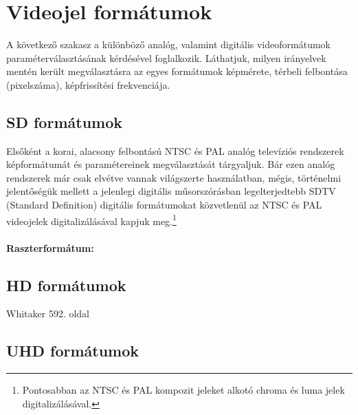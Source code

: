 \section{Videojel formátumok}

A következő szakasz a különböző analóg, valamint digitális videoformátumok paraméterválasztásának kérdésével foglalkozik.
Láthatjuk, milyen irányelvek mentén került megválasztásra az egyes formátumok képmérete, térbeli felbontása (pixelszáma), képfrissítési frekvenciája. 

\subsection{SD formátumok}

Elsőként a korai, alacsony felbontású NTSC és PAL analóg televíziós rendszerek képformátumát és paramétereinek megválasztását tárgyaljuk.
Bár ezen analóg rendszerek már csak elvétve vannak világszerte használatban, mégis, történelmi jelentőségük mellett a jelenlegi digitális műsorszórásban legelterjedtebb SDTV (Standard Definition) digitális formátumokat közvetlenül az NTSC és PAL videojelek digitalizálásával kapjuk meg.\footnote{Pontosabban az NTSC és PAL kompozit jeleket alkotó chroma és luma jelek digitalizálásával.}

\paragraph{Raszterformátum:}

\subsection{HD formátumok}

Whitaker 592. oldal

\subsection{UHD formátumok}

